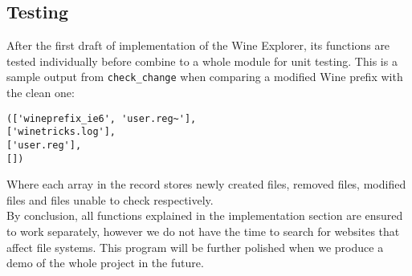 \subsection{Testing}
After the first draft of implementation of the Wine Explorer, its functions are
tested individually before combine to a whole module for unit testing. This is a sample 
output from \verb'check_change' when comparing a modified Wine prefix with 
the clean one:
\begin{verbatim}
(['wineprefix_ie6', 'user.reg~'], 
['winetricks.log'], 
['user.reg'], 
[])
\end{verbatim}
Where each array in the record stores newly created files, removed files, 
modified files and files unable to check respectively. \\
By conclusion, all functions 
explained in the implementation section are ensured to work separately, 
however we do not have the time to search for websites that affect file 
systems. This program will be further polished when we produce a demo 
of the whole project in the future. 




